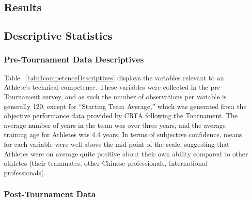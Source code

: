 \begin{CJK}{UTF8}{gbsn}
\section{Results\label{app8:results}}



\subsection{Descriptive Statistics}

\subsubsection{Pre-Tournament Data Descriptives \label{app8:descriptivesPre}}



Table ~\ref{tab:1competenceDescriptives} displays the variables relevant to an Athlete's technical competence.  These variables were collected in the pre-Tournament survey, and as such the number of observations per variable is generally 120, except for ``Starting Team Average,'' which was generated from the objective performance data provided by CRFA following the Tournament.  The average number of years in the team was over three years, and the average training age for Athletes was 4.4 years.  In terms of subjective confidence, means for each variable were well above the mid-point of the scale, suggesting that Athletes were on average quite positive about their own ability compared to other athletes (their teammates, other Chinese professionals, International professionals).




\subsubsection{Post-Tournament Data}

%
%
%
%


%
%
%

%




\end{CJK}
